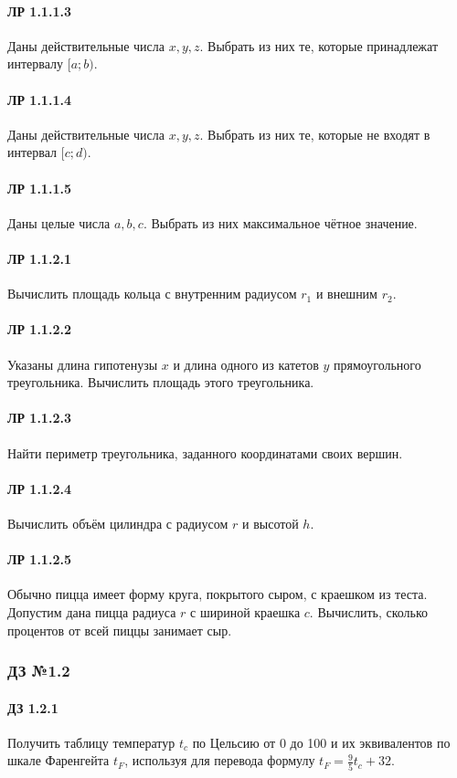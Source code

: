 \documentclass[12pt,a4paper]{report}
\begin{document}
\paragraph*{ЛР 1.1.1.3} Даны действительные числа $x, y, z$. Выбрать из них те, которые принадлежат интервалу $[a; b)$.
\paragraph*{ЛР 1.1.1.4} Даны действительные числа $x, y, z$. Выбрать из них те, которые не входят в интервал $[c; d)$.
\paragraph*{ЛР 1.1.1.5} Даны целые числа $a, b, c$. Выбрать из них максимальное чётное значение.

\paragraph*{ЛР 1.1.2.1} Вычислить площадь кольца с внутренним радиусом $r_1$ и внешним $r_2$.
\paragraph*{ЛР 1.1.2.2} Указаны длина гипотенузы $x$ и длина одного из катетов $y$ прямоугольного треугольника. Вычислить площадь этого треугольника.
\paragraph*{ЛР 1.1.2.3} Найти периметр треугольника, заданного координатами своих вершин.
\paragraph*{ЛР 1.1.2.4} Вычислить объём цилиндра с радиусом $r$ и высотой $h$.
\paragraph*{ЛР 1.1.2.5} Обычно пицца имеет форму круга, покрытого сыром, с краешком из теста. Допустим дана пицца радиуса $r$ с шириной краешка $c$. Вычислить, сколько процентов от всей пиццы занимает сыр.

\clearpage
\subsubsection*{ДЗ №1.2}
\paragraph*{ДЗ 1.2.1} Получить таблицу температур $t_c$ по Цельсию от 0 \textdegree до 100 \textdegree и их эквивалентов по шкале Фаренгейта $t_F$, используя для перевода формулу $t_F = \frac {9} {5} t_c + 32$.
\end{document}
